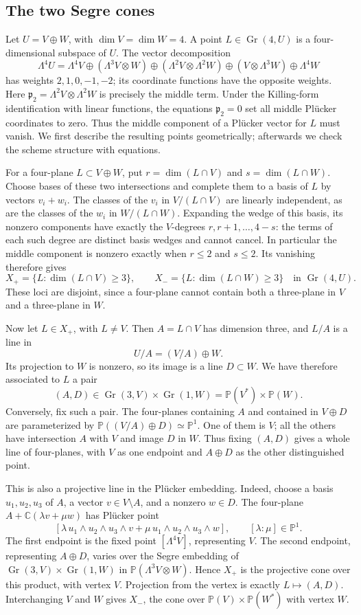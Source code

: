 \documentclass[11pt]{article}
\newcommand{\C}{\mathbb C}
\newcommand{\PP}{\mathbb P}
\newcommand{\Gr}{\operatorname{Gr}}
\newcommand{\fp}{\mathfrak p}
\theoremstyle{definition}
\numberwithin{equation}{section}
\begin{document}
\subsection{The two Segre cones}
Let $U=V\oplus W$, with $\dim V=\dim W=4$. A point
$L\in\Gr(4,U)$ is a four-dimensional subspace of $U$.
The vector decomposition
\[
 \Lambda^4U=\Lambda^4V\oplus(\Lambda^3V\otimes W)
 \oplus(\Lambda^2V\otimes\Lambda^2W)
 \oplus(V\otimes\Lambda^3W)\oplus\Lambda^4W
\]
has weights $2,1,0,-1,-2$; its coordinate functions have the opposite
weights. Here $\fp_2=\Lambda^2V\otimes\Lambda^2W$ is precisely
the middle term. Under the Killing-form identification with linear
functions, the equations $\fp_2=0$ set all middle Pl\"ucker coordinates
to zero. Thus the middle component of a Pl\"ucker vector for $L$ must
vanish. We first describe the resulting points geometrically; afterwards
we check the scheme structure with equations.

For a four-plane $L\subset V\oplus W$, put
$r=\dim(L\cap V)$ and $s=\dim(L\cap W)$. Choose bases of these
two intersections and complete them to a basis of $L$ by vectors
$v_i+w_i$. The classes of the $v_i$ in $V/(L\cap V)$ are linearly
independent, as are the classes of the $w_i$ in $W/(L\cap W)$.
Expanding the wedge of this basis, its nonzero components have exactly
the $V$-degrees $r,r+1,\ldots,4-s$: the terms of each such degree
are distinct basis wedges and cannot cancel. In particular the middle
component is nonzero exactly when $r\leq2$ and $s\leq2$.
Its vanishing therefore gives
\[
 X_+=\{L:\dim(L\cap V)\geq3\},\qquad
 X_-=\{L:\dim(L\cap W)\geq3\}
 \quad\text{in }\Gr(4,U).
\]
These loci are disjoint, since a four-plane cannot contain both a
three-plane in $V$ and a three-plane in $W$.

Now let $L\in X_+$, with $L\ne V$. Then $A=L\cap V$ has
dimension three, and $L/A$ is a line in
\[
 U/A=(V/A)\oplus W.
\]
Its projection to $W$ is nonzero, so its image is a line $D\subset W$.
We have therefore associated to $L$ a pair
\[
 (A,D)\in\Gr(3,V)\times\Gr(1,W)
       =\PP(V^*)\times\PP(W).
\]
Conversely, fix such a pair. The four-planes containing $A$ and contained
in $V\oplus D$ are parameterized by
$\PP((V/A)\oplus D)\simeq\PP^1$. One of them is $V$; all the
others have intersection $A$ with $V$ and image $D$ in $W$.
Thus fixing $(A,D)$ gives a whole line of four-planes, with $V$ as
one endpoint and $A\oplus D$ as the other distinguished point.

This is also a projective line in the Pl\"ucker embedding. Indeed,
choose a basis $u_1,u_2,u_3$ of $A$, a vector $v\in V\setminus A$,
and a nonzero $w\in D$. The four-plane
$A+\C(\lambda v+\mu w)$ has Pl\"ucker point
\[
 [\lambda\,u_1\wedge u_2\wedge u_3\wedge v
   +\mu\,u_1\wedge u_2\wedge u_3\wedge w],
 \qquad [\lambda:\mu]\in\PP^1.
\]
The first endpoint is the fixed point $[\Lambda^4V]$, representing $V$.
The second endpoint, representing $A\oplus D$, varies over the Segre
embedding of $\Gr(3,V)\times\Gr(1,W)$ in
$\PP(\Lambda^3V\otimes W)$. Hence $X_+$ is the projective cone
over this product, with vertex $V$. Projection from the vertex is
exactly $L\mapsto(A,D)$. Interchanging $V$ and $W$ gives $X_-$,
the cone over $\PP(V)\times\PP(W^*)$ with vertex $W$.
\end{document}
